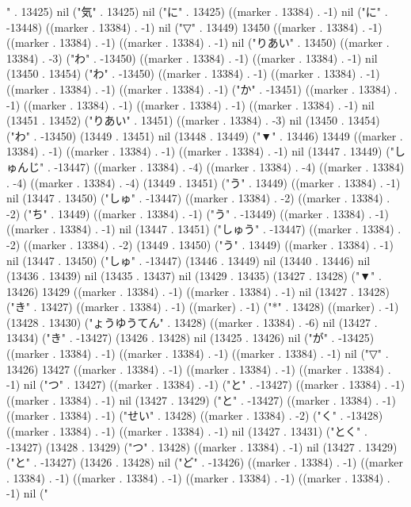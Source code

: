 " . 13425) nil ("気" . 13425) nil ("に" . 13425) ((marker . 13384) . -1) nil ("に" . -13448) ((marker . 13384) . -1) nil ("▽" . 13449) 13450 ((marker . 13384) . -1) ((marker . 13384) . -1) ((marker . 13384) . -1) nil ("りあい" . 13450) ((marker . 13384) . -3) ("わ" . -13450) ((marker . 13384) . -1) ((marker . 13384) . -1) nil (13450 . 13454) ("わ" . -13450) ((marker . 13384) . -1) ((marker . 13384) . -1) ((marker . 13384) . -1) ((marker . 13384) . -1) ("か" . -13451) ((marker . 13384) . -1) ((marker . 13384) . -1) ((marker . 13384) . -1) ((marker . 13384) . -1) nil (13451 . 13452) ("りあい" . 13451) ((marker . 13384) . -3) nil (13450 . 13454) ("わ" . -13450) (13449 . 13451) nil (13448 . 13449) ("▼" . 13446) 13449 ((marker . 13384) . -1) ((marker . 13384) . -1) ((marker . 13384) . -1) nil (13447 . 13449) ("しゅんじ" . -13447) ((marker . 13384) . -4) ((marker . 13384) . -4) ((marker . 13384) . -4) ((marker . 13384) . -4) (13449 . 13451) ("う" . 13449) ((marker . 13384) . -1) nil (13447 . 13450) ("しゅ" . -13447) ((marker . 13384) . -2) ((marker . 13384) . -2) ("ち" . 13449) ((marker . 13384) . -1) ("う" . -13449) ((marker . 13384) . -1) ((marker . 13384) . -1) nil (13447 . 13451) ("しゅう" . -13447) ((marker . 13384) . -2) ((marker . 13384) . -2) (13449 . 13450) ("う" . 13449) ((marker . 13384) . -1) nil (13447 . 13450) ("しゅ" . -13447) (13446 . 13449) nil (13440 . 13446) nil (13436 . 13439) nil (13435 . 13437) nil (13429 . 13435) (13427 . 13428) ("▼" . 13426) 13429 ((marker . 13384) . -1) ((marker . 13384) . -1) nil (13427 . 13428) ("き" . 13427) ((marker . 13384) . -1) ((marker) . -1) ("*" . 13428) ((marker) . -1) (13428 . 13430) ("ょうゆうてん" . 13428) ((marker . 13384) . -6) nil (13427 . 13434) ("き" . -13427) (13426 . 13428) nil (13425 . 13426) nil ("が" . -13425) ((marker . 13384) . -1) ((marker . 13384) . -1) ((marker . 13384) . -1) nil ("▽" . 13426) 13427 ((marker . 13384) . -1) ((marker . 13384) . -1) ((marker . 13384) . -1) nil ("つ" . 13427) ((marker . 13384) . -1) ("と" . -13427) ((marker . 13384) . -1) ((marker . 13384) . -1) nil (13427 . 13429) ("と" . -13427) ((marker . 13384) . -1) ((marker . 13384) . -1) ("せい" . 13428) ((marker . 13384) . -2) ("く" . -13428) ((marker . 13384) . -1) ((marker . 13384) . -1) nil (13427 . 13431) ("とく" . -13427) (13428 . 13429) ("つ" . 13428) ((marker . 13384) . -1) nil (13427 . 13429) ("と" . -13427) (13426 . 13428) nil ("ど" . -13426) ((marker . 13384) . -1) ((marker . 13384) . -1) ((marker . 13384) . -1) ((marker . 13384) . -1) ((marker . 13384) . -1) nil ("
